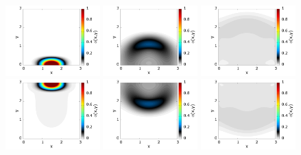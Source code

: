 \begin{figure}[h!]
\centering
  \includegraphics[width=0.325\textwidth]{figuras/sim_FMS_t30.png}
  \includegraphics[width=0.325\textwidth]{figuras/sim_FMS_t100.png}
  \includegraphics[width=0.325\textwidth]{figuras/sim_FMS_t170.png}\\
  \includegraphics[width=0.325\textwidth]{figuras/sim_FMS_t230.png}
  \includegraphics[width=0.325\textwidth]{figuras/sim_FMS_t300.png}
  \includegraphics[width=0.325\textwidth]{figuras/sim_FMS_t370.png}\\

\end{figure}

